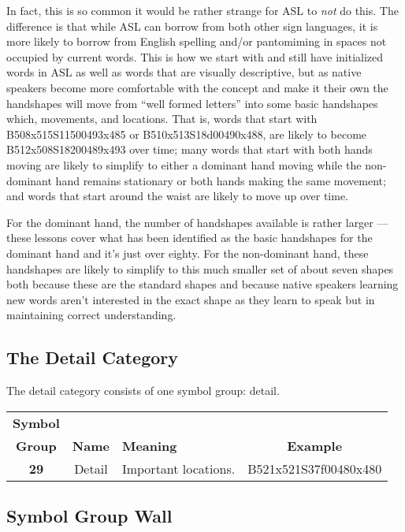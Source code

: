 \documentclass{article}
\begin{document}
In fact, this is so common it would be rather strange for ASL to \emph{not} do this.
The difference is that while ASL can borrow from both other sign languages, it is more likely to borrow from English spelling and/or pantomiming in spaces not occupied by current words.
This is how we start with and still have initialized words in ASL as well as words that are visually descriptive, but as native speakers become more comfortable with the concept and make it their own the handshapes will move from ``well formed letters'' into some basic handshapes which, movements, and locations.
That is, words that start with B508x515S11500493x485 or B510x513S18d00490x488, are likely to become B512x508S18200489x493 over time;
many words that start with both hands moving are likely to simplify to either a dominant hand moving while the non-dominant hand remains stationary or both hands making the same movement;
and words that start around the waist are likely to move up over time.

For the dominant hand, the number of handshapes available is rather larger --- these lessons cover what has been identified as the basic handshapes for the dominant hand and it's just over eighty.
For the non-dominant hand, these handshapes are likely to simplify to this much smaller set of about seven shapes both because these are the standard shapes and because native speakers learning new words aren't interested in the exact shape as they learn to speak but in maintaining correct understanding.

\subsection{The Detail Category}

The detail category consists of one symbol group: detail.

\begin{center}
\begin{tabular}{ccp{21mm}c}
\textbf{Symbol}\\
\textbf{Group}&\textbf{Name}&\textbf{Meaning}&\textbf{Example}\\
\textbf{29}&Detail&Important locations.&B521x521S37f00480x480\\
\end{tabular}
\end{center}

\subsection{Symbol Group Wall}
\end{document}
